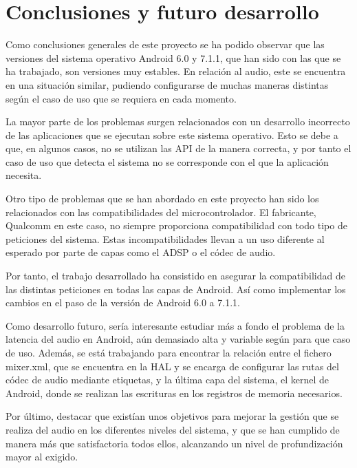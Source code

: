 \chapter{Conclusiones y futuro desarrollo}
Como conclusiones generales de este proyecto se ha podido observar que las versiones del sistema operativo Android 6.0 y 7.1.1, que han sido con las que se ha trabajado, son versiones muy estables. En relación al audio, este se encuentra en una situación similar, pudiendo configurarse de muchas maneras distintas según el caso de uso que se requiera en cada momento.

La mayor parte de los problemas surgen relacionados con un desarrollo incorrecto de las aplicaciones que se ejecutan sobre este sistema operativo. Esto se debe a que, en algunos casos, no se utilizan las \gls{API} de la manera correcta, y por tanto el caso de uso que detecta el sistema no se corresponde con el que la aplicación necesita.

Otro tipo de problemas que se han abordado en este proyecto han sido los relacionados con las compatibilidades del microcontrolador. El fabricante, Qualcomm en este caso, no siempre proporciona compatibilidad con todo tipo de peticiones del sistema. Estas incompatibilidades llevan a un uso diferente al esperado por parte de capas como el \gls{ADSP} o el códec de audio.

Por tanto, el trabajo desarrollado ha consistido en asegurar la compatibilidad de las distintas peticiones en todas las capas de Android. Así como implementar los cambios en el paso de la versión de Android 6.0 a 7.1.1.

Como desarrollo futuro, sería interesante estudiar más a fondo el problema de la latencia del audio en Android, aún demasiado alta y variable según para que caso de uso. Además, se está trabajando para encontrar la relación entre el fichero mixer.xml, que se encuentra en la \gls{HAL} y se encarga de configurar las rutas del códec de audio mediante etiquetas, y la última capa del sistema, el kernel de Android, donde se realizan las escrituras en los registros de memoria necesarios.

Por último, destacar que existían unos objetivos para mejorar la gestión que se realiza del audio en los diferentes niveles del sistema, y que se han cumplido de manera más que satisfactoria todos ellos, alcanzando un nivel de profundización mayor al exigido.



